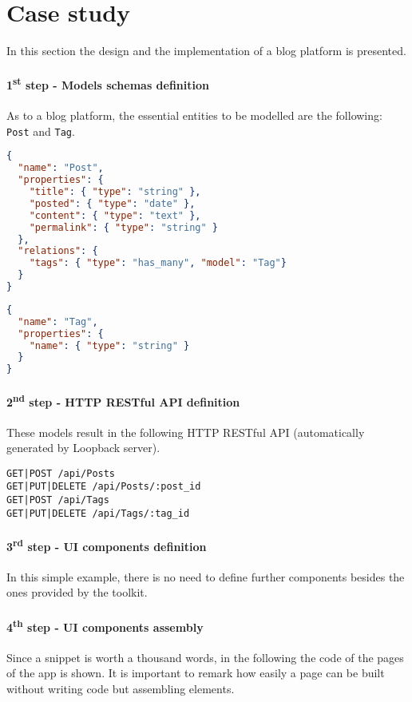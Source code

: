 \section{Case study}\label{sec:case-study}
In this section the design and the implementation of a blog platform is presented. 

\paragraph{1\textsuperscript{st} step - Models schemas definition}
As to a blog platform, the essential entities to be modelled are the following: \texttt{Post} and \texttt{Tag}.

\begin{lstlisting}[language=json]
{
  "name": "Post",
  "properties": {
    "title": { "type": "string" },
    "posted": { "type": "date" },
    "content": { "type": "text" },
    "permalink": { "type": "string" }
  }, 
  "relations": {
    "tags": { "type": "has_many", "model": "Tag"}
  }
}
\end{lstlisting}

\begin{lstlisting}[language=json]
{
  "name": "Tag",
  "properties": {
    "name": { "type": "string" }
  }
}
\end{lstlisting}

\paragraph{2\textsuperscript{nd} step - HTTP RESTful API definition}
These models result in the following HTTP RESTful API (automatically generated by Loopback server).

\begin{lstlisting}
GET|POST /api/Posts
GET|PUT|DELETE /api/Posts/:post_id
GET|POST /api/Tags
GET|PUT|DELETE /api/Tags/:tag_id
\end{lstlisting} 

\paragraph{3\textsuperscript{rd} step - UI components definition}
In this simple example, there is no need to define further components besides the ones provided by the  toolkit.

\paragraph{4\textsuperscript{th} step - UI components assembly}
Since a snippet is worth a thousand words, in the following the code of the pages of the app is shown.
It is important to remark how easily a page can be built without writing code but assembling elements.

